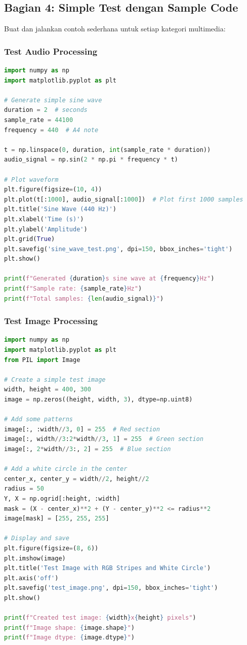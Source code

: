 \documentclass[11pt,a4paper]{article}
\begin{document}
\subsection{Bagian 4: Simple Test dengan Sample Code}
Buat dan jalankan contoh sederhana untuk setiap kategori multimedia:

\subsubsection{Test Audio Processing}
\begin{lstlisting}[language=Python, caption=Test audio processing sederhana]
import numpy as np
import matplotlib.pyplot as plt

# Generate simple sine wave
duration = 2  # seconds
sample_rate = 44100
frequency = 440  # A4 note

t = np.linspace(0, duration, int(sample_rate * duration))
audio_signal = np.sin(2 * np.pi * frequency * t)

# Plot waveform
plt.figure(figsize=(10, 4))
plt.plot(t[:1000], audio_signal[:1000])  # Plot first 1000 samples
plt.title('Sine Wave (440 Hz)')
plt.xlabel('Time (s)')
plt.ylabel('Amplitude')
plt.grid(True)
plt.savefig('sine_wave_test.png', dpi=150, bbox_inches='tight')
plt.show()

print(f"Generated {duration}s sine wave at {frequency}Hz")
print(f"Sample rate: {sample_rate}Hz")
print(f"Total samples: {len(audio_signal)}")
\end{lstlisting}

\subsubsection{Test Image Processing}
\begin{lstlisting}[language=Python, caption=Test image processing sederhana]
import numpy as np
import matplotlib.pyplot as plt
from PIL import Image

# Create a simple test image
width, height = 400, 300
image = np.zeros((height, width, 3), dtype=np.uint8)

# Add some patterns
image[:, :width//3, 0] = 255  # Red section
image[:, width//3:2*width//3, 1] = 255  # Green section
image[:, 2*width//3:, 2] = 255  # Blue section

# Add a white circle in the center
center_x, center_y = width//2, height//2
radius = 50
Y, X = np.ogrid[:height, :width]
mask = (X - center_x)**2 + (Y - center_y)**2 <= radius**2
image[mask] = [255, 255, 255]

# Display and save
plt.figure(figsize=(8, 6))
plt.imshow(image)
plt.title('Test Image with RGB Stripes and White Circle')
plt.axis('off')
plt.savefig('test_image.png', dpi=150, bbox_inches='tight')
plt.show()

print(f"Created test image: {width}x{height} pixels")
print(f"Image shape: {image.shape}")
print(f"Image dtype: {image.dtype}")
\end{lstlisting}
\end{document}
